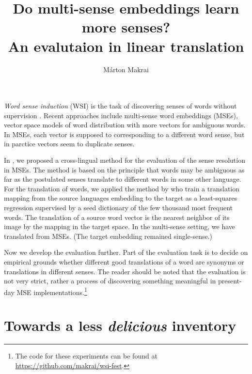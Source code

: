 \documentclass[11pt]{article}
\title{Do multi-sense embeddings learn more senses? \\ An evalutaion in linear
translation}
\author{
  Márton Makrai
}
\date{}
\begin{document}
\maketitle




\emph{Word sense induction} (WSI) is the task of discovering senses of words
without supervision \citep{Schutze:1998}. Recent approaches include multi-sense
word embeddings (MSEs), vector space models of word distribution with more
vectors for ambiguous words. In MSEs, each vector is supposed to corresponding
to a different word sense, but in parctice vectors seem to duplicate senses.

In \cite{Borbely:2016}, we proposed a cross-lingual method for the evaluation
of the sense resolution in MSEs. The method is based on the principle that
words may be ambiguous as far as the postulated senses translate to different
words in some other language.  For the translation of words, we applied the
method by \citet{Mikolov:2013x} who train a translation mapping from the source
languages embedding to the target as a least-squares regression supervised by a
seed dictionary of the few thousand most frequent words. The translation of a
source word vector is the nearest neighbor of its image by the mapping in the
target space. In the multi-sense setting, we have translated from MSEs. (The
target embedding remained single-sense.)

Now we develop the evaluation further. Part of the evaluation task is to decide
on empirical grounds whether different good translations of a word are synonyms
or translations in different senses.  
The reader should
be noted that the evaluation is not very strict, rather a process of
discovering something meaningful in present-day MSE
implementations.\footnote{The code for these experiments can be found at
\url{https://github.com/makrai/wsi-fest}.}

\section{Towards a less \emph{delicious} inventory}
\end{document}
